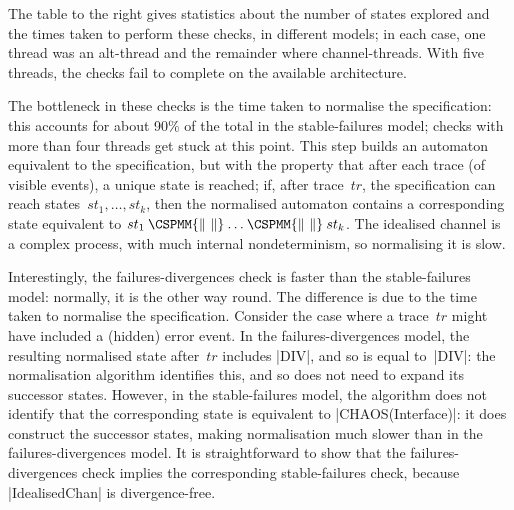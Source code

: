 \begin{window}
%
The table to the right gives statistics about the number of states explored
and the times taken to perform these checks, in different models; in each
case, one thread was an alt-thread and the remainder where channel-threads.
With five threads, the checks fail to complete on the available architecture.
\end{window}

The bottleneck in these checks is the time taken to normalise the
specification: this accounts for about 90\% of the total in the
stable-failures model; checks with more than four threads get stuck at this
point.  This step builds an automaton equivalent to the specification, but
with the property that after each trace (of visible events), a unique state is
reached; if, after trace~$tr$, the specification can reach
states~$st_1,\ldots,st_k$, then the normalised automaton contains a
corresponding state equivalent to $st_1 \mathbin{\CSPMM{\|~\|}} \ldots
\mathbin{\CSPMM{\|~\|}} st_k$.  The idealised channel is a complex process,
with much internal nondeterminism, so normalising it is slow.


 
Interestingly, the failures-divergences check is faster than the
stable-failures model: normally, it is the other way round.  The difference is
due to the time taken to normalise the specification.
Consider the case where a trace~$tr$ might have included a (hidden) error
event.  In the failures-divergences model, the resulting normalised state
after~$tr$ includes |DIV|, and so is equal to~|DIV|: the normalisation
algorithm identifies this, and so does not need to expand its successor
states.  However, in the stable-failures model, the algorithm does not
identify that the corresponding state is equivalent to |CHAOS(Interface)|: it
does construct the successor states, making normalisation much slower than in
the failures-divergences model.  It is straightforward to show that the
failures-divergences check implies the corresponding stable-failures check,
because |IdealisedChan| is divergence-free.


